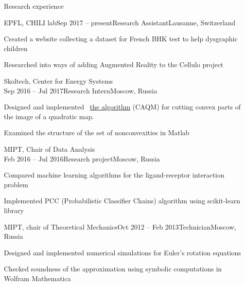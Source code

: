 \documentclass{resume} %
\begin{document}
\begin{rSection}{Research experience}
	\begin{rSubsection}{EPFL, CHILI lab}{Sep 2017 -- present}{Research Assistant}{Lausanne, Switzerland}
		\item Created a website collecting a dataset for French BHK test to help dysgraphic children
		\item Researched into ways of adding Augmented Reality to the Cellulo project
	\end{rSubsection}
	
	\begin{rSubsection}{Skoltech, Center for Energy Systems}{\\Sep 2016 -- Jul 2017}{Research Intern}{Moscow, Russia}
		\item Designed and implemented \faExternalLink~\href{https://github.com/sergeivolodin/CertificateCutting}{the algorithm} (CAQM) for cutting convex parts of the image of a quadratic map.
		\item Examined the structure of the set of nonconvexities in Matlab
	\end{rSubsection}
	
	\begin{rSubsection}{MIPT, Chair of Data Analysis}{\\Feb 2016 -- Jul 2016}{Research project}{Moscow, Russia}
		\item Compared machine learning algorithms for the ligand-receptor interaction problem
		\item Implemented PCC (Probabilistic Classifier Chains) algorithm using scikit-learn library
	\end{rSubsection}
	
	\begin{rSubsection}{MIPT, chair of Theoretical Mechanics}{Oct 2012 -- Feb 2013}{Technician}{Moscow, Russia}
		\item Designed and implemented numerical simulations for Euler's rotation equations
		\item Checked soundness of the approximation using symbolic computations in Wolfram Mathematica
	\end{rSubsection}
\end{rSection}
\end{document}
